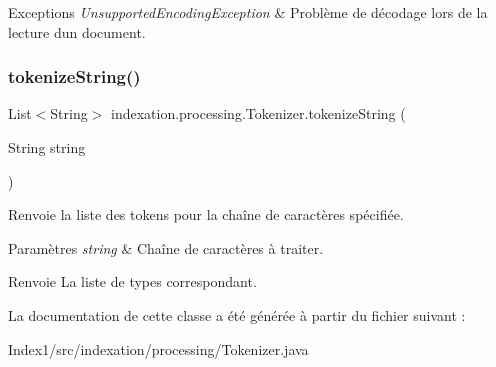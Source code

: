 \begin{DoxyExceptions}{Exceptions}
{\em Unsupported\+Encoding\+Exception} & Problème de décodage lors de la lecture d\textquotesingle{}un document. \\
\hline
\end{DoxyExceptions}
\mbox{\label{classindexation_1_1processing_1_1Tokenizer_a3987c2977e98439758035b5b9f2c7e89}} 
\subsubsection{\texorpdfstring{tokenize\+String()}{tokenizeString()}}
{\footnotesize\ttfamily List$<$String$>$ indexation.\+processing.\+Tokenizer.\+tokenize\+String (\begin{DoxyParamCaption}\item[{String}]{string }\end{DoxyParamCaption})}

Renvoie la liste des tokens pour la chaîne de caractères spécifiée.


\begin{DoxyParams}{Paramètres}
{\em string} & Chaîne de caractères à traiter. \\
\hline
\end{DoxyParams}
\begin{DoxyReturn}{Renvoie}
La liste de types correspondant. 
\end{DoxyReturn}


La documentation de cette classe a été générée à partir du fichier suivant \+:\begin{DoxyCompactItemize}
\item 
Index1/src/indexation/processing/Tokenizer.\+java\end{DoxyCompactItemize}
